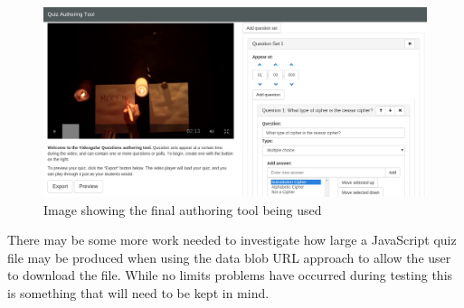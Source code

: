 \begin{figure}[h]
	\centering
		\includegraphics[width=\textwidth]{../figures/authoring_tool_example.png} 		
	\caption{\label{Figure:Authoring_Tool} Image showing the final authoring tool being used} 	
\end{figure}

There may be some more work needed to investigate how large a JavaScript quiz file may be produced when using the data blob URL approach to allow the user to download the file. While no limits problems have occurred during testing this is something that will need to be kept in mind.